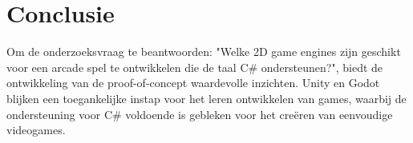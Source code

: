
\chapter{Conclusie}%
\label{ch:conclusie}

Om de onderzoeksvraag te beantwoorden: "Welke 2D game engines zijn geschikt voor een arcade spel te ontwikkelen die de taal C\# ondersteunen?", biedt de ontwikkeling van de proof-of-concept waardevolle inzichten. Unity en Godot blijken een toegankelijke instap voor het leren ontwikkelen van games, waarbij de ondersteuning voor C\# voldoende is gebleken voor het creëren van eenvoudige videogames.